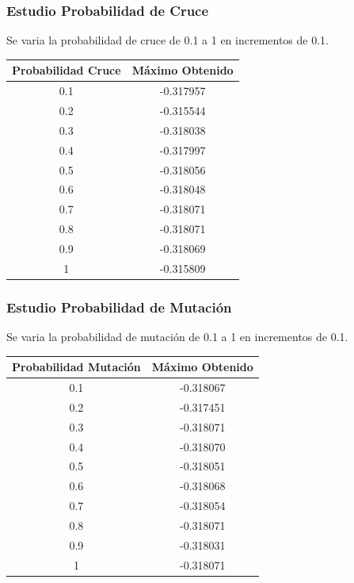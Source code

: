 \documentclass[12pt]{article}
\begin{document}
\subsubsection*{Estudio Probabilidad de Cruce}
	Se varia la probabilidad de cruce de 0.1 a 1 en incrementos de 0.1.
\begin{table}[H]
\begin{center}
\begin{tabular}{|cc|} \hline
Probabilidad Cruce & Máximo Obtenido \\  \hline
0.1 & -0.317957 \\ 
0.2 & -0.315544 \\ 
0.3 & -0.318038 \\
0.4 & -0.317997 \\
0.5 & -0.318056 \\
0.6 & -0.318048 \\
0.7 & -0.318071 \\
0.8 & -0.318071 \\ 
0.9 & -0.318069 \\
1   & -0.315809 \\  \hline
\end{tabular}
\end{center}
\end{table}
\subsubsection*{Estudio Probabilidad de Mutación}
	Se varia la probabilidad de mutación de 0.1 a 1 en incrementos de 0.1.
\begin{table}[H]
\begin{center}
\begin{tabular}{|cc|} \hline
Probabilidad Mutación & Máximo Obtenido \\  \hline
0.1 & -0.318067 \\ 
0.2 & -0.317451 \\ 
0.3 & -0.318071 \\
0.4 & -0.318070 \\
0.5 & -0.318051 \\
0.6 & -0.318068 \\
0.7 & -0.318054 \\
0.8 & -0.318071 \\ 
0.9 & -0.318031 \\
1   & -0.318071 \\  \hline
\end{tabular}
\end{center}
\end{table}
\end{document}
